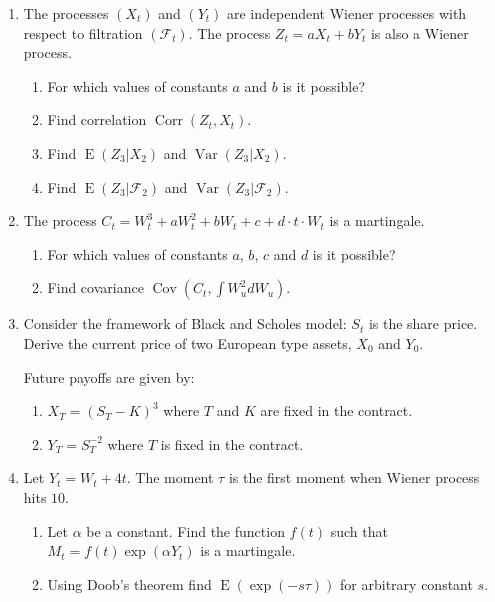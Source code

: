\documentclass[12pt]{article}
\DeclareMathOperator{\Cov}{Cov}
\DeclareMathOperator{\Corr}{Corr}
\DeclareMathOperator{\Var}{Var}
\DeclareMathOperator{\E}{E}
\begin{document}
\begin{enumerate}

\item The processes $(X_t)$ and $(Y_t)$ are independent Wiener processes with respect to filtration $(\mathcal{F}_t)$.
The process $Z_t = aX_t + b Y_t$ is also a Wiener process. 
\begin{enumerate}
  \item For which values of constants $a$ and $b$ is it possible?
  \item Find correlation $\Corr(Z_t, X_t)$.
  \item Find $\E(Z_3 | X_2)$ and $\Var(Z_3 | X_2)$.
  \item Find $\E(Z_3 | \mathcal{F}_2)$ and $\Var(Z_3 | \mathcal{F}_2)$.
\end{enumerate}


\item The process $C_t = W_t^3 + aW_t^2 +b W_t + c + d\cdot t\cdot W_t$ is a martingale.
\begin{enumerate}
  \item For which values of constants $a$, $b$, $c$ and $d$ is it possible?
  \item Find covariance $\Cov(C_t, \int W^2_u dW_u)$.
\end{enumerate}

\item Consider the framework of Black and Scholes model: $S_t$ is the share price. 
Derive the current price of two European type assets, $X_0$ and $Y_0$. 

Future payoffs are given by:
\begin{enumerate}
  \item $X_T = (S_T - K)^3$ where $T$ and $K$ are fixed in the contract.
  \item $Y_T = S_T^{-2}$ where $T$ is fixed in the contract. 
\end{enumerate}

\item Let $Y_t = W_t + 4t$. The moment $\tau$ is the first moment when Wiener process hits $10$. 
\begin{enumerate}
  \item Let $\alpha$ be a constant. Find the function $f(t)$ such that $M_t = f(t)\exp(\alpha Y_t)$ is a martingale.
  \item Using Doob's theorem find $\E(\exp(-s \tau))$ for arbitrary constant $s$. 
\end{enumerate}



\end{enumerate}
\end{document}

